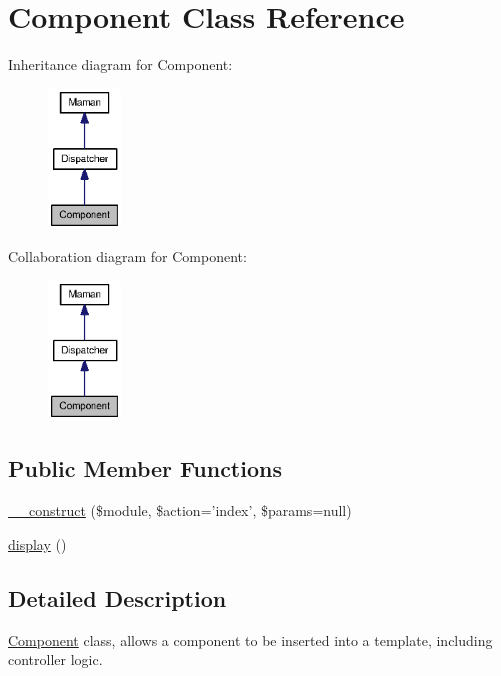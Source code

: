 \hypertarget{classComponent}{
\section{Component Class Reference}
\label{classComponent}
}
Inheritance diagram for Component:\nopagebreak
\begin{figure}[H]
\begin{center}
\leavevmode
\includegraphics[width=55pt]{classComponent__inherit__graph}
\end{center}
\end{figure}
Collaboration diagram for Component:\nopagebreak
\begin{figure}[H]
\begin{center}
\leavevmode
\includegraphics[width=55pt]{classComponent__coll__graph}
\end{center}
\end{figure}
\subsection*{Public Member Functions}
\begin{CompactItemize}
\item 
\hyperlink{classComponent_941aa95779d197b421b80d79a689da80}{\_\-\_\-construct} (\$module, \$action='index', \$params=null)
\item 
\hyperlink{classComponent_0a0409f0dc2092c2aa383123f98ca09c}{display} ()
\end{CompactItemize}


\subsection{Detailed Description}
\hyperlink{classComponent}{Component} class, allows a component to be inserted into a template, including controller logic. 

